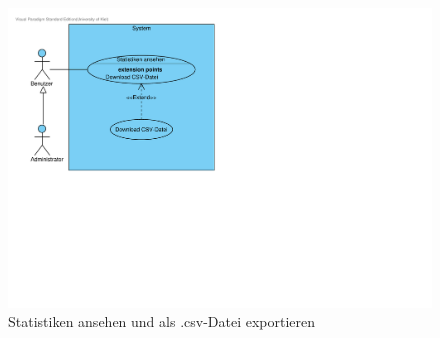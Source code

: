 \documentclass[10pt,a4paper]{article}
\begin{document}
        \begin{figure}[h]
	  \includegraphics[width=\linewidth]{gfx/webseite/statistikfunktion.pdf}
          \caption{Statistiken ansehen und als .csv-Datei exportieren}
	\end{figure}
        
\end{document}
